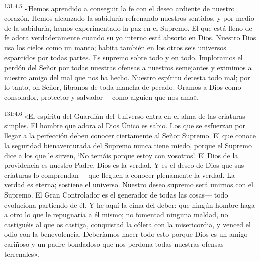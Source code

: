 \par 
\textsuperscript{131:4.5} «Hemos aprendido a conseguir la fe con el deseo ardiente de nuestro corazón. Hemos alcanzado la sabiduría refrenando nuestros sentidos, y por medio de la sabiduría, hemos experimentado la paz en el Supremo. El que está lleno de fe adora verdaderamente cuando su yo interno está absorto en Dios. Nuestro Dios usa los cielos como un manto; habita también en los otros seis universos esparcidos por todas partes. Es supremo sobre todo y en todo. Imploramos el perdón del Señor por todas nuestras ofensas a nuestros semejantes y eximimos a nuestro amigo del mal que nos ha hecho. Nuestro espíritu detesta todo mal; por lo tanto, oh Señor, líbranos de toda mancha de pecado. Oramos a Dios como consolador, protector y salvador ---como alguien que nos ama».

\par 
\textsuperscript{131:4.6} «El espíritu del Guardián del Universo entra en el alma de las criaturas simples. El hombre que adora al Dios Único es sabio. Los que se esfuerzan por llegar a la perfección deben conocer ciertamente al Señor Supremo. El que conoce la seguridad bienaventurada del Supremo nunca tiene miedo, porque el Supremo dice a los que le sirven, `No temáis porque estoy con vosotros'. El Dios de la providencia es nuestro Padre. Dios es la verdad. Y es el deseo de Dios que sus criaturas lo comprendan ---que lleguen a conocer plenamente la verdad. La verdad es eterna; sostiene el universo. Nuestro deseo supremo será unirnos con el Supremo. El Gran Controlador es el generador de todas las cosas--- todo evoluciona partiendo de él. Y he aquí la cima del deber: que ningún hombre haga a otro lo que le repugnaría a él mismo; no fomentad ninguna maldad, no castiguéis al que os castiga, conquistad la cólera con la misericordia, y venced el odio con la benevolencia. Deberíamos hacer todo esto porque Dios es un amigo cariñoso y un padre bondadoso que nos perdona todas nuestras ofensas terrenales».

